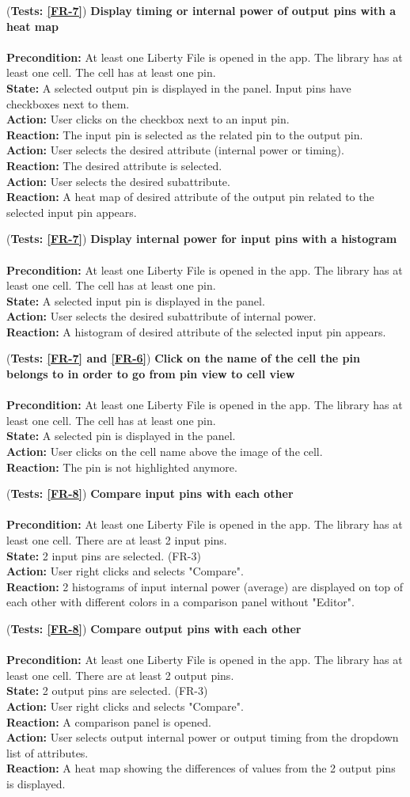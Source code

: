 \documentclass[10pt,a4paper]{report}
\newcommand{\precondition}[1]{
    \textbf{Precondition: } #1 \leavevmode \\
}
\newcommand{\action}[1]{
    \textbf{Action: } #1 \leavevmode \\
}
\newcommand{\state}[1]{
    \textbf{State: } #1 \leavevmode \\
}
\newcommand{\reaction}[1]{
    \textbf{Reaction: } #1 \leavevmode \\
}
\newcommand{\GTCDescription}[2]{
    (\textbf{Tests: #1}) \textbf{#2} \leavevmode \\
}
\begin{document}
\begin{GTC}
    \item \GTCDescription{\ref{FR-7}}{Display timing or internal power of output pins with a heat map} \leavevmode \\ \precondition{At least one Liberty File is opened in the app. The library has at least one cell. The cell has at least one pin.}\state{A selected output pin is displayed in the panel. Input pins have checkboxes next to them.}\action{User clicks on the checkbox next to an input pin.}\reaction{The input pin is selected as the related pin to the output pin.}\action{User selects the desired attribute (internal power or timing).}\reaction{The desired attribute is selected.}\action{User selects the desired subattribute.}\reaction{A heat map of desired attribute of the output pin related to the selected
	input pin appears.
}
    
    \item \GTCDescription{\ref{FR-7}}{Display internal power for input pins with a histogram} \leavevmode \\ \precondition{At least one Liberty File is opened in the app. The library has at least one cell. The cell has at least one pin.}\state{A selected input pin is displayed in the panel.}\action{User selects the desired subattribute of internal power.}\reaction{A histogram of desired attribute of the selected input pin appears.
}
    
    \item \GTCDescription{\ref{FR-7} and \ref{FR-6}}{Click on the name of the cell the pin belongs to in order to go from pin view to cell view} \leavevmode \\ \precondition{At least one Liberty File is opened in the app. The library has at least one cell. The cell has at least one pin.}\state{A selected pin is displayed in the panel. }\action{User clicks on the cell name above the image of the cell.}\reaction{The pin is not highlighted anymore.
}
    
    \item \GTCDescription{\ref{FR-8}}{Compare input pins with each other} \leavevmode \\ \precondition{At least one Liberty File is opened in the app. The library has at least one cell. There are at least 2 input pins.}\state{2 input pins are selected. (FR-3)}\action{User right clicks and selects "Compare".}\reaction{2 histograms of input internal power (average) are displayed on top of each other with different colors in a comparison panel without "Editor".
}
    
    \item \GTCDescription{\ref{FR-8}}{Compare output pins with each other} \leavevmode \\ \precondition{At least one Liberty File is opened in the app. The library has at least one cell. There are at least 2 output pins.}\state{2 output pins are selected. (FR-3)}\action{User right clicks and selects "Compare".}\reaction{A comparison panel is opened.}\action{User selects output internal power or output timing from the dropdown list of attributes.}\reaction{A heat map showing the differences of values from the 2 output pins is displayed.
}
    

\end{GTC}
\end{document}
